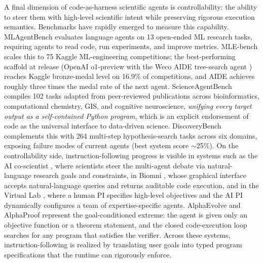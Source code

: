 \documentclass{llmxive}
\begin{document}
A final dimension of code-as-harness scientific agents is controllability: the ability to steer them with high-level scientific intent while preserving rigorous execution semantics. Benchmarks have rapidly emerged to measure this capability. MLAgentBench \citep{huang2024mlagentbenchevaluatinglanguageagents} evaluates language agents on 13 open-ended ML research tasks, requiring agents to read code, run experiments, and improve metrics. MLE-bench \citep{chan2025mlebenchevaluatingmachinelearning} scales this to 75 Kaggle ML-engineering competitions; the best-performing scaffold at release (OpenAI o1-preview with the Weco AIDE tree-search agent \citep{hu2025surveyscientificlargelanguage}) reaches Kaggle bronze-medal level on 16.9\% of competitions, and AIDE achieves roughly three times the medal rate of the next agent. ScienceAgentBench \citep{chen2025scienceagentbenchrigorousassessmentlanguage} compiles 102 tasks adapted from peer-reviewed publications across bioinformatics, computational chemistry, GIS, and cognitive neuroscience, \textit{unifying every target output as a self-contained Python program}, which is an explicit endorsement of code as the universal interface to data-driven science. DiscoveryBench \citep{majumder2024discoverybenchdatadrivendiscoverylarge} complements this with 264 multi-step hypothesis-search tasks across six domains, exposing failure modes of current agents (best system score $\sim$25\%). On the controllability side, instruction-following progress is visible in systems such as the AI co-scientist \citep{gottweis2025aicoscientist}, where scientists steer the multi-agent debate via natural-language research goals and constraints, in Biomni \citep{huang2025biomni}, whose graphical interface accepts natural-language queries and returns auditable code execution, and in the Virtual Lab \citep{swanson2025virtual}, where a human PI specifies high-level objectives and the AI PI dynamically configures a team of expertise-specific agents. AlphaEvolve \citep{novikov2025alphaevolvecodingagentscientific} and AlphaProof \citep{hubert2025olympiad} represent the goal-conditioned extreme: the agent is given only an objective function or a theorem statement, and the closed code-execution loop searches for any program that satisfies the verifier. Across these systems, instruction-following is realized by translating user goals into typed program specifications that the runtime can rigorously enforce.
\end{document}
